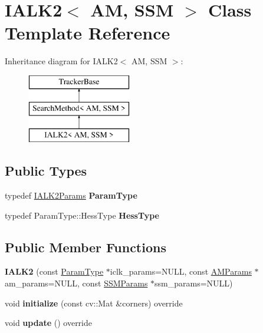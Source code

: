 \hypertarget{classIALK2}{\section{I\-A\-L\-K2$<$ A\-M, S\-S\-M $>$ Class Template Reference}
\label{classIALK2}
}
Inheritance diagram for I\-A\-L\-K2$<$ A\-M, S\-S\-M $>$\-:\begin{figure}[H]
\begin{center}
\leavevmode
\includegraphics[height=3.000000cm]{classIALK2}
\end{center}
\end{figure}
\subsection*{Public Types}
\begin{DoxyCompactItemize}
\item 
\hypertarget{classIALK2_aaf71baa2009274abafe1f0ffc99cbb73}{typedef \hyperlink{structIALK2Params}{I\-A\-L\-K2\-Params} {\bfseries Param\-Type}}\label{classIALK2_aaf71baa2009274abafe1f0ffc99cbb73}

\item 
\hypertarget{classIALK2_a06929e07f9be24fe60291d760f6a667d}{typedef Param\-Type\-::\-Hess\-Type {\bfseries Hess\-Type}}\label{classIALK2_a06929e07f9be24fe60291d760f6a667d}

\end{DoxyCompactItemize}
\subsection*{Public Member Functions}
\begin{DoxyCompactItemize}
\item 
\hypertarget{classIALK2_a44df892466a7a49197ddc3da43a3443c}{{\bfseries I\-A\-L\-K2} (const \hyperlink{structIALK2Params}{Param\-Type} $\ast$iclk\-\_\-params=N\-U\-L\-L, const \hyperlink{structAMParams}{A\-M\-Params} $\ast$am\-\_\-params=N\-U\-L\-L, const \hyperlink{structSSMParams}{S\-S\-M\-Params} $\ast$ssm\-\_\-params=N\-U\-L\-L)}\label{classIALK2_a44df892466a7a49197ddc3da43a3443c}

\item 
\hypertarget{classIALK2_a36d6c057a850223ce0436945d837dfb6}{void {\bfseries initialize} (const cv\-::\-Mat \&corners) override}\label{classIALK2_a36d6c057a850223ce0436945d837dfb6}

\item 
\hypertarget{classIALK2_a9f9cbdb110c86602334ca6a5db31445e}{void {\bfseries update} () override}\label{classIALK2_a9f9cbdb110c86602334ca6a5db31445e}

\end{DoxyCompactItemize}
